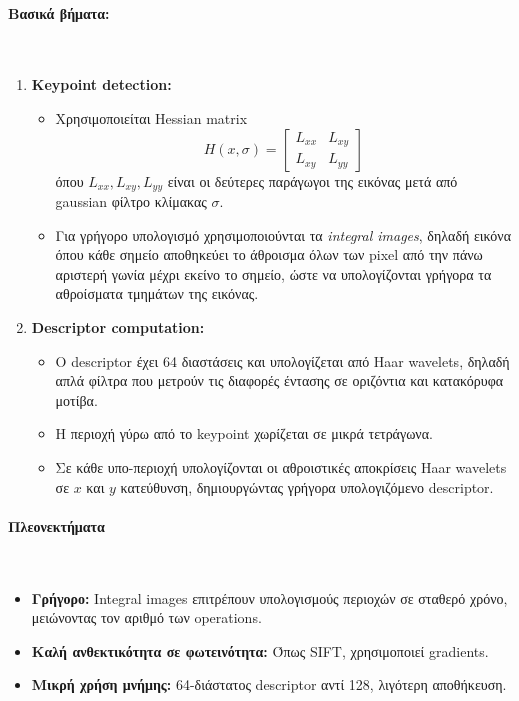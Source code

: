 \documentclass[12pt]{article}
\begin{document}
\paragraph{Βασικά βήματα:}
\mbox{}\\
\begin{enumerate}
  \item \textbf{Keypoint detection:}
  \begin{itemize}
      \item Χρησιμοποιείται Hessian matrix
      \[
      H(x,\sigma) = 
      \begin{bmatrix}
      L_{xx} & L_{xy} \\
      L_{xy} & L_{yy}
      \end{bmatrix}
      \]
      όπου $L_{xx}, L_{xy}, L_{yy}$ είναι οι δεύτερες παράγωγοι της εικόνας μετά από gaussian φίλτρο κλίμακας $\sigma$.
      \item Για γρήγορο υπολογισμό χρησιμοποιούνται τα \textit{integral images}, δηλαδή εικόνα όπου κάθε σημείο αποθηκεύει το άθροισμα όλων των pixel από την πάνω αριστερή γωνία μέχρι εκείνο το σημείο, ώστε να υπολογίζονται γρήγορα τα αθροίσματα τμημάτων της εικόνας.
  \end{itemize}
  
  \item \textbf{Descriptor computation:}
  \begin{itemize}
      \item Ο descriptor έχει 64 διαστάσεις και υπολογίζεται από Haar wavelets, δηλαδή απλά φίλτρα που μετρούν τις διαφορές έντασης σε οριζόντια και κατακόρυφα μοτίβα.
      \item Η περιοχή γύρω από το keypoint χωρίζεται σε μικρά τετράγωνα.
      \item Σε κάθε υπο-περιοχή υπολογίζονται οι αθροιστικές αποκρίσεις Haar wavelets σε $x$ και $y$ κατεύθυνση, δημιουργώντας γρήγορα υπολογιζόμενο descriptor.
  \end{itemize}
\end{enumerate}



\paragraph{Πλεονεκτήματα}
\mbox{}\\
\begin{itemize}
  \item \textbf{Γρήγορο:} Integral images επιτρέπουν υπολογισμούς περιοχών σε σταθερό χρόνο, μειώνοντας τον αριθμό των operations.
  
  \item \textbf{Καλή ανθεκτικότητα σε φωτεινότητα:} Όπως SIFT, χρησιμοποιεί gradients.
  
  \item \textbf{Μικρή χρήση μνήμης:} 64-διάστατος descriptor αντί 128, λιγότερη αποθήκευση.
\end{itemize}
\end{document}
